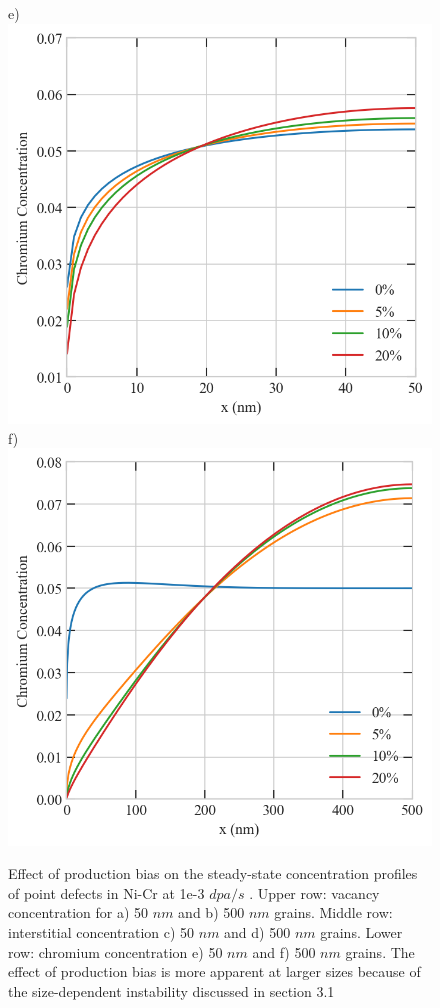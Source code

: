\documentclass[utf8]{frontiersSCNS} %
\begin{document}
\begin{figure}[h!]
        e)\includegraphics[scale=0.55]{srrt/plots/Fig13_e.png}
        f)\includegraphics[scale=0.55]{srrt/plots/Fig13_f.png}
        \caption{Effect of production bias on the steady-state concentration profiles of point defects in Ni-Cr at 1e-3 $dpa/s$ . Upper row: vacancy concentration for a) 50 $nm$ and b) 500 $nm$ grains. Middle row: interstitial concentration c) 50 $nm$ and d) 500 $nm$ grains. Lower row: chromium concentration e) 50 $nm$ and f) 500 $nm$ grains. The effect of production bias is more apparent at larger sizes because of the size-dependent instability discussed in section 3.1}
        \label{figure:RIS_773K_0vs5vs10vs20}
      \end{figure}
\end{document}
